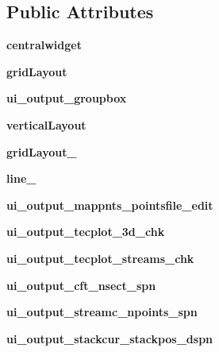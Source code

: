 \subsection*{Public Attributes}
\begin{DoxyCompactItemize}
\item 
\hypertarget{a00075_a99bcc614e5be2356b9b0e54f30bb009e}{}\label{a00075_a99bcc614e5be2356b9b0e54f30bb009e} 
{\bfseries centralwidget}
\item 
\hypertarget{a00075_aad085c53319e511b5f37895a71336716}{}\label{a00075_aad085c53319e511b5f37895a71336716} 
{\bfseries grid\+Layout}
\item 
\hypertarget{a00075_a342c5c54417df97a32a10f28fe93d81e}{}\label{a00075_a342c5c54417df97a32a10f28fe93d81e} 
{\bfseries ui\+\_\+output\+\_\+groupbox}
\item 
\hypertarget{a00075_ae33ea0222b6e62c39a7081946f32072a}{}\label{a00075_ae33ea0222b6e62c39a7081946f32072a} 
{\bfseries vertical\+Layout}
\item 
\hypertarget{a00075_ad528f27c7c549b388b9a6dc2e24f9880}{}\label{a00075_ad528f27c7c549b388b9a6dc2e24f9880} 
{\bfseries grid\+Layout\+\_}
\item 
\hypertarget{a00075_a55227446d0a73588ace14f77945ec2ee}{}\label{a00075_a55227446d0a73588ace14f77945ec2ee} 
{\bfseries line\+\_}
\item 
\hypertarget{a00075_a8020c73e1cf12f6c112a79f2c34af062}{}\label{a00075_a8020c73e1cf12f6c112a79f2c34af062} 
{\bfseries ui\+\_\+output\+\_\+mappnts\+\_\+pointsfile\+\_\+edit}
\item 
\hypertarget{a00075_a47635280e1268bda03a8e1f69a03fc35}{}\label{a00075_a47635280e1268bda03a8e1f69a03fc35} 
{\bfseries ui\+\_\+output\+\_\+tecplot\+\_\+3d\+\_\+chk}
\item 
\hypertarget{a00075_a08c1ff077d7bec4a77e7f540b681c71a}{}\label{a00075_a08c1ff077d7bec4a77e7f540b681c71a} 
{\bfseries ui\+\_\+output\+\_\+tecplot\+\_\+streams\+\_\+chk}
\item 
\hypertarget{a00075_a7689384c6c651ee544d44f0029a731b5}{}\label{a00075_a7689384c6c651ee544d44f0029a731b5} 
{\bfseries ui\+\_\+output\+\_\+cft\+\_\+nsect\+\_\+spn}
\item 
\hypertarget{a00075_a7376266aa4a7bdb95b74e14c4e2294c0}{}\label{a00075_a7376266aa4a7bdb95b74e14c4e2294c0} 
{\bfseries ui\+\_\+output\+\_\+streamc\+\_\+npoints\+\_\+spn}
\item 
\hypertarget{a00075_a51d1efb48954a11443baee2265fb4a2a}{}\label{a00075_a51d1efb48954a11443baee2265fb4a2a} 
{\bfseries ui\+\_\+output\+\_\+stackcur\+\_\+stackpos\+\_\+dspn}

\end{DoxyCompactItemize}
